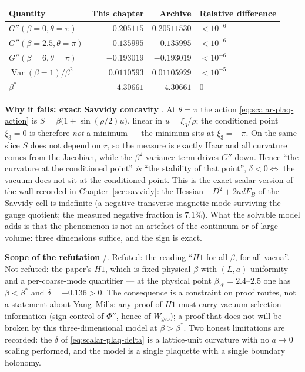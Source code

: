 \footnotesize
\begin{center}
\begin{tabular}{@{}>{\raggedright\arraybackslash}p{6.0cm}rrl@{}}
\toprule
Quantity & This chapter & Archive & Relative difference\\
\midrule
$G''(\beta=0,\theta=\pi)$ & $0.205115$ & $0.20511530$ & $<10^{-6}$\\
$G''(\beta=2.5,\theta=\pi)$ & $0.135995$ & $0.135995$ & $<10^{-6}$\\
$G''(\beta=6,\theta=\pi)$ & $-0.193019$ & $-0.193019$ & $<10^{-6}$\\
$\operatorname{Var}(\beta=1)/\beta^2$ & $0.0110593$ & $0.01105929$ & $<10^{-5}$\\
$\beta^*$ & $4.30661$ & $4.30661$ & $0$\\
\bottomrule
\end{tabular}
\label{tab:scalar-archive}
\end{center}

\normalsize
\textbf{Why it fails: exact Savvidy concavity} \LT. At $\theta=\pi$ the action
\eqref{eq:scalar-plaq-action} is $S=\beta\bigl(1+\sin(\rho/2)u\bigr)$, linear in $u=\xi_3/\rho$;
the conditioned point $\xi_3=0$ is therefore \emph{not} a minimum --- the minimum sits at
$\xi_3=-\pi$. On the same slice $S$ does not depend on $r$, so the measure is exactly Haar and all
curvature comes from the Jacobian, while the $\beta^2$ variance term drives $G''$ down. Hence
``the curvature at the conditioned point'' \emph{is} ``the stability of that point'',
$\delta<0\iff$ the vacuum does not sit at the conditioned point. This is the exact scalar version of
the wall recorded in Chapter~\ref{sec:savvidy}: the Hessian $-D^2+2adF_B$ of the Savvidy cell is
indefinite (a negative transverse magnetic mode surviving the gauge quotient; the measured
negative fraction is $7.1\%$). What the solvable model adds is that the phenomenon is not an
artefact of the continuum or of large volume: three dimensions suffice, and the sign is exact.

\textbf{Scope of the refutation} \LN{}/\LM. Refuted: the reading ``$H1$ for all $\beta$, for all
vacua''. Not refuted: the paper's $H1$, which is fixed physical $\beta$ with $(L,a)$-uniformity and
a per-coarse-mode quantifier --- at the physical point $\beta_W=2.4$--$2.5$ one has
$\beta<\beta^*$ and $\delta=+0.136>0$. The consequence is a constraint on proof routes, not a
statement about Yang--Mills: any proof of $H1$ must carry vacuum-selection information (sign
control of $\Phi''$, hence of $W_{\mathrm{geo}}$); a proof that does not will be broken by this
three-dimensional model at $\beta>\beta^*$. Two honest limitations are recorded: the $\delta$ of
\eqref{eq:scalar-plaq-delta} is a lattice-unit curvature with no $a\to0$ scaling performed, and the
model is a single plaquette with a single boundary holonomy.

